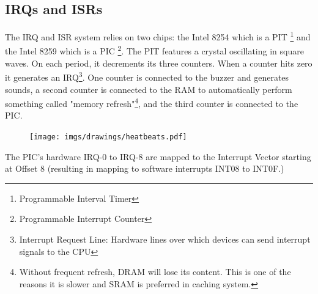 \subsection{IRQs and ISRs}
The IRQ and ISR system relies on two chips: the Intel 8254 which is a PIT \footnote{Programmable Interval Timer} and the Intel 8259 which is a PIC \footnote{Programmable Interrupt Counter}. The PIT features a crystal oscillating in square waves. On each period, it decrements its three counters. When a counter hits zero it generates an IRQ\footnote{Interrupt Request Line: Hardware lines over which devices can send interrupt signals to the CPU}. One counter is connected to the buzzer and generates sounds, a second counter is connected to the RAM to automatically perform something called "memory refresh"\footnote{Without frequent refresh, DRAM will lose its content. This is one of the reasons it is slower and SRAM is preferred in caching system.}, and the third counter is connected to the PIC.\\
\par
\begin{figure}[H]
\centering
 \texttt{[image: imgs/drawings/heatbeats.pdf]}
 \end{figure}
\par

The PIC's hardware IRQ-0 to IRQ-8 are mapped to the Interrupt Vector starting at Offset 8 (resulting in mapping to software interrupts INT08 to INT0F.)\\

